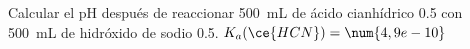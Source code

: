 Calcular el pH después de reaccionar \SI{500}{\milli\liter} de ácido cianhídrico \SI{0,5}{\Molar} con \SI{500}{\milli\liter} de hidróxido de sodio \SI{0,5}{\Molar}. $K_a(\ce{HCN}) = \num{4,9e-10}$
